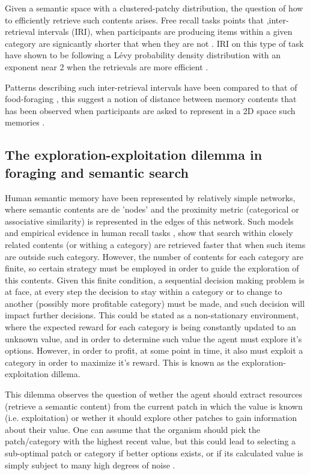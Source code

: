 \documentclass[11pt]{article}
\begin{document}
Given a semantic space with a clustered-patchy distribution, the question of how
to efficiently retrieve such contents arises. Free recall tasks points that
,inter-retrieval intervals (IRI), when participants are producing items within a given
category are signicantly shorter that when they are not
\citep{abbottRandomWalksSemantic2015a}. IRI on this type of task have shown to be
following a Lévy probability density distribution with an exponent near 2 when
the retrievals are more efficient \citep{rhodesHumanMemoryRetrieval2007a}.

Patterns describing such inter-retrieval intervals have been compared to that of
food-foraging \citep{rhodesHumanMemoryRetrieval2007a}, this suggest a notion of
distance between memory contents that has been observed when participants are
asked to represent in a 2D space such memories
\citep{montezRoleSemanticClustering2015}.
\subsection{The exploration-exploitation dilemma in foraging and semantic search}
\label{sec:orga98a787}

Human semantic memory have been represented by relatively simple networks, where
semantic contents are de 'nodes' and the proximity metric (categorical or
associative similarity) is represented in the edges of this network. Such models
and empirical evidence in human recall tasks
\citep{hillsOptimalForagingSemantic2012a}, show that search within closely related
contents (or withing a category) are retrieved faster that when such items are
outside such category. However, the number of contents for each category are
finite, so certain strategy must be employed in order to guide the exploration
of this contents. Given this finite condition, a sequential decision making
problem is at face, at every step the decision to stay within a category or to
change to another (possibly more profitable category) must be made, and such
decision will impact further decisions. This could be stated as a non-stationary
environment, where the expected reward for each category is being constantly
updated to an unknown value, and in order to determine such value the agent must
explore it's options. However, in order to profit, at some point in time, it
also must exploit a category in order to maximize it's reward. This is known as
the exploration-exploitation dillema.

This dilemma observes the question of wether the agent should extract resources
(retrieve a semantic content) from the current patch in which the value is known
(i.e. exploitation) or wether it should explore other patches to gain
information about their value. One can assume that the organism should pick the
patch/category with the highest recent value, but this could lead to selecting a
sub-optimal patch or category if better options exists, or if its calculated
value is simply subject to many high degrees of noise
\citep{hernandez-lealExplorationStrategyNonstationary2016}.
\end{document}
